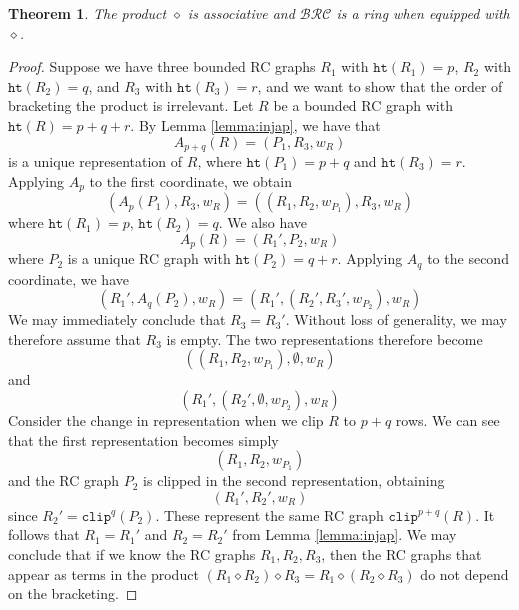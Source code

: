 \documentclass{amsart}
\newtheorem{theorem}{Theorem}[section]
\theoremstyle{definition}
\theoremstyle{remark}
\numberwithin{equation}{subsection}
\newcommand{\wof}[1]{w_{#1}}
\newcommand{\trm}{\mathtt{trim}}
\newcommand{\hr}{\mathtt{ht}}
\newcommand{\clp}{\mathtt{clip}}
\newcommand{\BRC}{\mathcal{BRC}}
\newcommand{\dcoma}{\mathcal{D}}
\begin{document}
\begin{theorem}
	 The product $\diamond$ is associative and $\BRC$ is a ring when equipped with $\diamond$.%
\end{theorem}
\begin{proof}
Suppose we have three bounded RC graphs $R_1$ with $\hr(R_1)=p$, $R_2$ with $\hr(R_2)=q$, and $R_3$ with $\hr(R_3)=r$, and we want to show that the order of bracketing the product is irrelevant. Let $R$ be a bounded RC graph with $\hr(R)=p+q+r$. By Lemma \ref{lemma:injap}, we have that
$$A_{p+q}(R)=(P_1, R_3, \wof{R})$$
is a unique representation of $R$, where $\hr(P_1)=p+q$ and $\hr(R_3)=r$. Applying $A_p$ to the first coordinate, we obtain
$$(A_p(P_1), R_3, \wof{R})=((R_1, R_2, \wof{P_1}), R_3, \wof{R})$$
where $\hr(R_1)=p$, $\hr(R_2)=q$. We also have
$$A_{p}(R)=(R_1', P_2, \wof{R})$$
where $P_2$ is a unique RC graph with $\hr(P_2) = q+r$. Applying $A_q$ to the second coordinate, we have
$$(R_1', A_q(P_2), \wof{R})=(R_1', (R_2', R_3', \wof{P_2}), \wof{R})$$
We may immediately conclude that $R_3=R_3'$. Without loss of generality, we may therefore assume that $R_3$ is empty. The two representations therefore become
$$((R_1, R_2, \wof{P_1}), \emptyset, \wof{R})$$
and
$$(R_1', (R_2', \emptyset, \wof{P_2}), \wof{R})$$
Consider the change in representation when we clip $R$ to $p+q$ rows. We can see that the first representation becomes simply
$$(R_1, R_2,\wof{P_1})$$
and the RC graph $P_2$ is clipped in the second representation, obtaining
$$(R_1', R_2', \wof{R})$$
since $R_2'=\clp^q(P_2)$. These represent the same RC graph $\clp^{p+q}(R)$. It follows that $R_1=R_1'$ and $R_2=R_2'$ from Lemma \ref{lemma:injap}. We may conclude that if we know the RC graphs $R_1, R_2, R_3$, then the RC graphs that appear as terms in the product $(R_1\diamond R_2)\diamond R_3 = R_1\diamond(R_2\diamond R_3)$ do not depend on the bracketing.


\end{proof}
\end{document}
